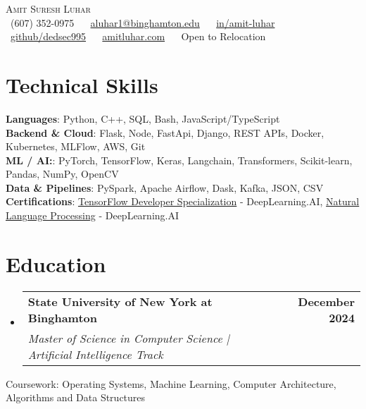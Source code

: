 \documentclass[letterpaper,8pt]{article}
\makeatletter
\newcommand{\resumeSubheading}[4]{
  \vspace{-2pt}\item
    \begin{tabular*}{1.0\textwidth}[t]{l@{\extracolsep{\fill}}r}
      \textbf{#1} & \textbf{\small #2} \\
      \textit{\small#3} & \textit{\small #4} \\
    \end{tabular*}\vspace{-7pt}
}
\newcommand{\resumeSubHeadingListStart}{\begin{itemize}[leftmargin=0.0in, label={}]}
\newcommand{\resumeSubHeadingListEnd}{\end{itemize}}\vspace{0pt}
\makeatother
\begin{document}

\begin{center}
    {\huge \scshape Amit Suresh Luhar} \\[2mm]
    \small \raisebox{-0.1\height}
    \faPhone\ (607) 352-0975 ~ 
    {\faEnvelope\  \href{mailto:aluhar1@binghamton.edu}{aluhar1@binghamton.edu}} ~ 
    {\faLinkedin\ \href{https://www.linkedin.com/in/amit-luhar/}{in/amit-luhar}}  ~
    {\faGithub\ \href{https://github.com/dedsec995}{github/dedsec995}} ~
    {\faBriefcase\ \href{https://amitluhar.com/}{amitluhar.com}} ~
    {\faGlobe\ {Open to Relocation}}
    \vspace{-5pt}
\end{center}

\section{Technical Skills}
  \begin{itemize}[leftmargin=0.0in, label={}]
    \small{\item{   
    \textbf{Languages}{: Python, C++, SQL, Bash, JavaScript/TypeScript} \\[1mm]
    \textbf{Backend \& Cloud}{: Flask, Node, FastApi, Django, REST APIs, Docker, Kubernetes, MLFlow, AWS, Git} \\[1mm]
    \textbf{ML / AI:}{: PyTorch, TensorFlow, Keras, Langchain, Transformers, Scikit-learn, Pandas, NumPy, OpenCV} \\ [1mm]
    \textbf{Data \& Pipelines}{: PySpark, Apache Airflow, Dask, Kafka, JSON, CSV} \\ [1mm]
    \textbf{Certifications}{: \href{https://www.coursera.org/account/accomplishments/specialization/certificate/YW8U4922JT6N}{TensorFlow Developer Specialization} - DeepLearning.AI, \href{https://www.coursera.org/account/accomplishments/certificate/PXWY38Y7VJZB}{Natural Language Processing} - DeepLearning.AI } \\ [1mm]
    }}
  \end{itemize}
\vspace{-13pt}

\section{Education}
  \resumeSubHeadingListStart
    \resumeSubheading
    {State University of New York at Binghamton}{December 2024}
    {Master of Science in Computer Science | Artificial Intelligence Track}{}
  \resumeSubHeadingListEnd
  \vspace{-4pt}
  Coursework: Operating Systems, Machine Learning, Computer Architecture, Algorithms and Data Structures \vspace{-4pt}
  \vspace{-4pt}
\end{document}
